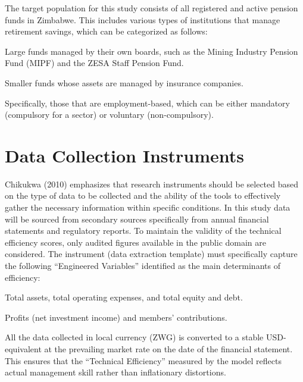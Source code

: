 \documentclass[12pt,a4paper]{article}
\begin{document}
The target population for this study consists of all registered and active pension funds in Zimbabwe. This includes various types of institutions that manage retirement savings, which can be categorized as follows:

\begin{description}[noitemsep]
    \item[Self-Administered (Standalone) Funds:] Large funds managed by their own boards, such as the Mining Industry Pension Fund (MIPF) and the ZESA Staff Pension Fund.
    \item[Insured/Underwritten Funds:] Smaller funds whose assets are managed by insurance companies.
    \item[Occupational Schemes (Pillar II):] Specifically, those that are employment-based, which can be either mandatory (compulsory for a sector) or voluntary (non-compulsory).
\end{description}

\section{Data Collection Instruments}

Chikukwa (2010) emphasizes that research instruments should be selected based on the type of data to be collected and the ability of the tools to effectively gather the necessary information within specific conditions. In this study data will be sourced from secondary sources specifically from annual financial statements and regulatory reports. To maintain the validity of the technical efficiency scores, only audited figures available in the public domain are considered. The instrument (data extraction template) must specifically capture the following ``Engineered Variables'' identified as the main determinants of efficiency:

\begin{description}[noitemsep]
    \item[Inputs:] Total assets, total operating expenses, and total equity and debt.
    \item[Outputs:] Profits (net investment income) and members' contributions.
\end{description}

All the data collected in local currency (ZWG) is converted to a stable USD-equivalent at the prevailing market rate on the date of the financial statement. This ensures that the ``Technical Efficiency'' measured by the model reflects actual management skill rather than inflationary distortions.
\end{document}
